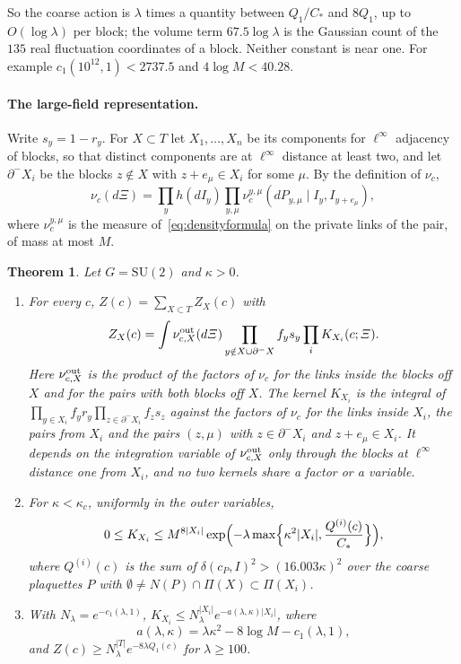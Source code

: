 \documentclass[11pt]{amsart}
\newtheorem{theorem}{Theorem}[section]
\theoremstyle{definition}
\theoremstyle{remark}
\numberwithin{equation}{section}
\newcommand{\SU}{\mathrm{SU}}
\begin{document}
So the coarse action is $\lambda$ times a quantity between $Q_1/C_*$ and
$8Q_1$, up to $O(\log\lambda)$ per block; the volume term $67.5\log\lambda$
is the Gaussian count of the $135$ real fluctuation coordinates of a block.
Neither constant is near one. For example $c_1(10^{12},1)<2737.5$ and
$4\log M<40.28$.

\paragraph*{The large-field representation.}
Write $s_y=1-r_y$. For $X\subset T$ let $X_1,\dots,X_n$ be its components
for $\ell^\infty$ adjacency of blocks, so that distinct components are at
$\ell^\infty$ distance at least two, and let $\partial^-X_i$ be the blocks
$z\notin X$ with $z+e_\mu\in X_i$ for some $\mu$. By the definition of
$\nu_c$,
\[
\nu_c(d\varXi)=\prod_yh(dI_y)\prod_{y,\mu}\nu^{y,\mu}_{c}(dP_{y,\mu}\mid
I_y,I_{y+e_\mu}),
\]
where $\nu^{y,\mu}_c$ is the measure of~\eqref{eq:densityformula} on the
private links of the pair, of mass at most $M$.

\begin{theorem}\label{thm:lfmarkov}
Let $G=\SU(2)$ and $\kappa>0$.
\begin{enumerate}[label=\textup{(\roman*)},leftmargin=*]
\item For every $c$, $Z(c)=\sum_{X\subset T}Z_X(c)$ with
\[
Z_X(c)=\int\nu^{\rm out}_{c,X}(d\varXi)\prod_{y\notin X\cup\partial^-X}
f_ys_y\prod_iK_{X_i}(c;\varXi).
\]
Here $\nu^{\rm out}_{c,X}$ is the product of the factors of $\nu_c$ for
the links inside the blocks off $X$ and for the pairs with both blocks off
$X$. The kernel $K_{X_i}$ is the integral of $\prod_{y\in X_i}f_yr_y
\prod_{z\in\partial^-X_i}f_zs_z$ against the factors of $\nu_c$ for the
links inside $X_i$, the pairs from $X_i$ and the pairs $(z,\mu)$ with $z\in
\partial^-X_i$ and $z+e_\mu\in X_i$. It depends on the integration variable
of $\nu^{\rm out}_{c,X}$ only through the blocks at $\ell^\infty$ distance
one from $X_i$, and no two kernels share a factor or a variable.
\item For $\kappa<\kappa_c$, uniformly in the outer variables,
\[
0\le K_{X_i}\le M^{8|X_i|}\exp\Bigl(-\lambda\max\Bigl\{\kappa^2|X_i|,
\frac{Q^{(i)}(c)}{C_*}\Bigr\}\Bigr),
\]
where $Q^{(i)}(c)$ is the sum of $\delta(c_P,I)^2>(16.003\kappa)^2$ over
the coarse plaquettes $P$ with $\emptyset\ne N(P)\cap\Pi(X)\subset\Pi(X_i)$.
\item With $N_\lambda=e^{-c_1(\lambda,1)}$, $K_{X_i}\le N_\lambda^{|X_i|}
e^{-a(\lambda,\kappa)|X_i|}$, where
\[
a(\lambda,\kappa)=\lambda\kappa^2-8\log M-c_1(\lambda,1),
\]
and $Z(c)\ge N_\lambda^{|T|}e^{-8\lambda Q_1(c)}$ for $\lambda\ge100$.
\end{enumerate}
\end{theorem}
\end{document}
